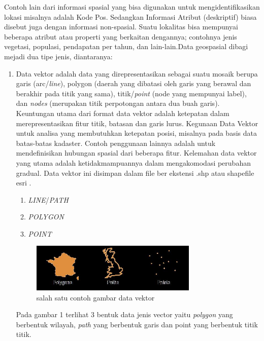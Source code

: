 Contoh lain dari informasi spasial yang bisa digunakan untuk mengidentifikasikan lokasi misalnya adalah Kode Pos. Sedangkan Informasi Atribut (deskriptif) biasa disebut juga dengan informasi non-spasial. Suatu lokalitas bisa mempunyai beberapa atribut atau properti yang berkaitan dengannya; contohnya jenis vegetasi, populasi, pendapatan per tahun, dan lain-lain.\cite{prasetyo2018estimasi}Data geospasial dibagi mejadi dua tipe jenis, diantaranya:

\begin{enumerate}
\item Data vektor adalah data yang direpresentasikan sebagai suatu mosaik berupa garis (arc/\textit{line}), polygon (daerah yang dibatasi oleh garis yang berawal dan berakhir pada titik yang sama), titik/\textit{point} (node yang mempunyai label), dan \textit{nodes} (merupakan titik perpotongan antara dua buah garis). Keuntungan utama dari format data vektor adalah ketepatan dalam merepresentasikan fitur titik, batasan dan garis lurus. Kegunaan Data Vektor untuk analisa yang membutuhkan ketepatan posisi, misalnya pada basis data batas-batas kadaster. Contoh penggunaan lainnya adalah untuk mendefinisikan hubungan spasial dari beberapa fitur. Kelemahan data vektor yang utama adalah ketidakmampuannya dalam mengakomodasi perubahan gradual. Data vektor ini disimpan dalam file ber ekstensi .shp atau shapefile esri \cite{prasetyo2018estimasi}.
	\begin{enumerate}
	\item \textit{LINE}/\textit{PATH}
	\item \textit{POLYGON}
	\item \textit{POINT}
	\end{enumerate}
		\begin{figure}[htbp]
		\centering
		\includegraphics[width=0.75\textwidth]{pictures/datavektor.jpg}
		\caption{salah satu contoh gambar data vektor}
		\label{labelgambar2}
		\end{figure}	
	Pada gambar 1 terlihat 3 bentuk data jenis vector yaitu \textit{polygon} yang berbentuk wilayah, \textit{path} yang berbentuk garis dan point yang berbentuk titik titik.


\end{enumerate}
